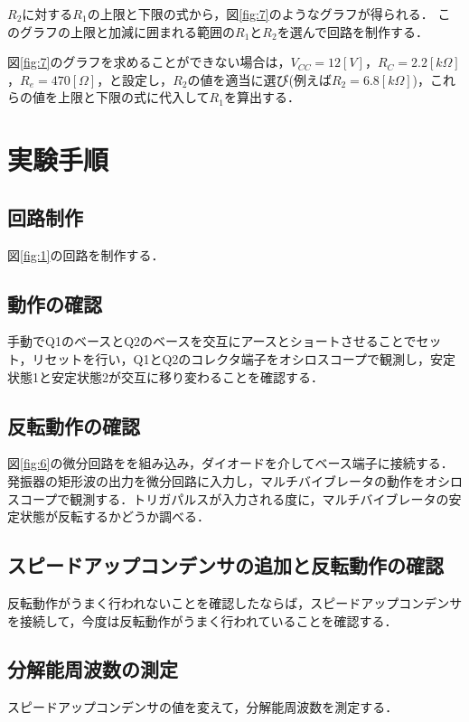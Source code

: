 \documentclass[10pt, a4j, dvipdfmx]{jarticle}
\begin{document}
    $R_2$に対する$R_1$の上限と下限の式から，図\ref{fig:7}のようなグラフが得られる．
    このグラフの上限と加減に囲まれる範囲の$R_1$と$R_2$を選んで回路を制作する．

    図\ref{fig:7}のグラフを求めることができない場合は，$V_{CC} = 12 [V]$，$R_C = 2.2 [k\Omega]$，$R_e = 470 [\Omega]$，と設定し，$R_2$の値を適当に選び(例えば$R_2 = 6.8 [k\Omega]$)，これらの値を上限と下限の式に代入して$R_1$を算出する．


    \newpage
    \section{実験手順}
    \subsection{回路制作}
    図\ref{fig:1}の回路を制作する．
    \subsection{動作の確認}
    手動でQ1のベースとQ2のベースを交互にアースとショートさせることでセット，リセットを行い，Q1とQ2のコレクタ端子をオシロスコープで観測し，安定状態1と安定状態2が交互に移り変わることを確認する．
    \subsection{反転動作の確認}
    図\ref{fig:6}の微分回路をを組み込み，ダイオードを介してベース端子に接続する．発振器の矩形波の出力を微分回路に入力し，マルチバイブレータの動作をオシロスコープで観測する．トリガパルスが入力される度に，マルチバイブレータの安定状態が反転するかどうか調べる．
    \subsection{スピードアップコンデンサの追加と反転動作の確認}
    反転動作がうまく行われないことを確認したならば，スピードアップコンデンサを接続して，今度は反転動作がうまく行われていることを確認する．
    \subsection{分解能周波数の測定}
    スピードアップコンデンサの値を変えて，分解能周波数を測定する．
\end{document}
